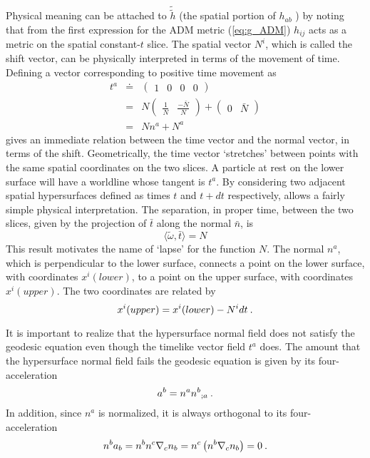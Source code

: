 Physical meaning can be attached to ${\tilde {\tilde h}}$ (the spatial portion
of $h_{ab}$ ) by noting that from the first expression for the ADM metric
(\ref{eq:g_ADM}) $h_{ij}$ acts as a metric on the spatial constant-$t$ slice.
The spatial vector $N^i$, which is called the shift vector, can be
physically interpreted in terms of the movement of time.  Defining a vector
corresponding to positive time movement as
\begin{eqnarray*}
  t^a & \doteq & \left( \begin{array}{cccc} 1 & 0 & 0 & 0 \end{array} \right) \\
      &   =    &  N \left( \begin{array}{cc}
                             \frac{1}{N} & \frac{-\bar N}{N}
                           \end{array}
                    \right) +
                    \left( \begin{array}{cc}
                             0 & \bar N
                           \end{array}
                    \right) \\
      &   =    & N n^a + N^a
\end{eqnarray*}
gives an immediate relation between the time vector and the normal vector, in
terms of the shift.
Geometrically, the time vector `stretches' between points with the same spatial
coordinates on the two slices.
A particle at rest on the lower surface will have a worldline whose tangent
is $t^a$.
By considering two adjacent spatial hypersurfaces defined
as times $t$ and $t+dt$ respectively, allows a fairly simple physical
interpretation.
The separation, in proper time, between the two slices, given by the projection
of $\bar t$ along the normal $\bar n$, is
\[
  \langle \tilde \omega , \bar t \rangle = N
\]
This result motivates the name of `lapse' for the function $N$.
The normal $n^a$, which is perpendicular to the lower surface, connects a
point on the lower surface, with coordinates $x^i(lower)$, to a point on
the upper surface, with coordinates $x^i(upper)$.
The two coordinates are related by
\[
   x^i(upper) = x^i(lower) - N^i dt \: .
\]

It is important to realize that the hypersurface normal field does not satisfy
the geodesic equation even though the timelike vector field $t^a$ does.  The
amount that the hypersurface normal field fails the geodesic equation is given
by its four-acceleration
\[
   a^{b} = n^a {n^b}_{;a} \: .
\]
In addition, since $n^a$ is normalized, it is always orthogonal to its four-
acceleration
\[
   n^b a_b = n^b n^c \nabla_c n_b= n^c \left( n^b \nabla_c n_b \right) = 0 \: .
\]


